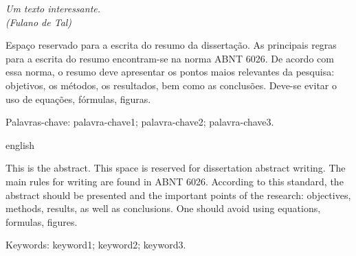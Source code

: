 \begin{epigrafe}
    \vspace*{\fill}
	\begin{flushright}
		\textit{
            Um texto interessante.\\
		      (Fulano de Tal)
        }
	\end{flushright}
\end{epigrafe}


\begin{resumo}
\SingleSpacing

    \noindent Espaço reservado para a escrita do resumo da dissertação. As principais regras para a escrita do resumo encontram-se na norma ABNT 6026. De acordo com essa norma, o resumo deve apresentar os pontos maios relevantes da pesquisa: objetivos, os métodos, os resultados, bem como as conclusões. Deve-se evitar o uso de equações, fórmulas, figuras.
    
    \vspace{\onelineskip}
    
    \noindent
    Palavras-chave: palavra-chave1; palavra-chave2; palavra-chave3.
    
\end{resumo}

\begin{resumo}
\SingleSpacing
    \begin{otherlanguage*}{english}
    
        \noindent This is the abstract. This space is reserved for dissertation abstract writing. The main rules for writing are found in ABNT 6026. According to this standard, the abstract should be presented and the important points of the research: objectives, methods, results, as well as conclusions. One should avoid using equations, formulas, figures.
        
        \vspace{\onelineskip}
        
        \noindent 
        Keywords: keyword1; keyword2; keyword3.
        
    \end{otherlanguage*}
\end{resumo}






